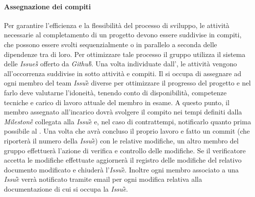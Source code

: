 	\paragraph{Assegnazione dei compiti}
	Per garantire l'efficienza e la flessibilità del processo di sviluppo, le attività necessarie al completamento di un progetto devono essere suddivise in compiti, che possono essere svolti sequenzialmente o in parallelo a seconda delle dipendenze tra di loro. Per ottimizzare tale processo il gruppo utilizza il sistema delle \emph{Issues\G{}} offerto da \emph{Github\G}.	
	Una volta individuate dall'\Ana{}, le attività vengono all'occorrenza suddivise in sotto attività e compiti. Il \RdP{} si occupa di assegnare ad ogni membro del team \emph{Issue}\G{} diverse per ottimizzare il progresso del progetto e nel farlo deve valutarne l'idoneità, tenendo conto di disponibilità, competenze tecniche e carico di lavoro attuale del membro in esame. A questo punto, il membro assegnato all'incarico dovrà svolgere il compito nei tempi definiti dalla \emph{Milestone\G{}} collegata alla \emph{Issue}\G{} e, nel caso di contrattempi, notificarlo quanto prima possibile al \RdP{}. Una volta che avrà concluso il proprio lavoro e fatto un commit (che riporterà il numero della \emph{Issue}\G{}) con le relative modifiche, un altro membro del gruppo effettuerà l'azione di verifica e controllo delle modifiche. Se il verificatore accetta le modifiche effettuate aggiornerà il registro delle modifiche del relativo documento modificato e chiuderà l'\emph{Issue}\G{}. Inoltre ogni membro associato a una \emph{Issue}\G{} verrà notificato tramite email per ogni modifica relativa alla documentazione %
	di cui si occupa la \emph{Issue}\G{}.
